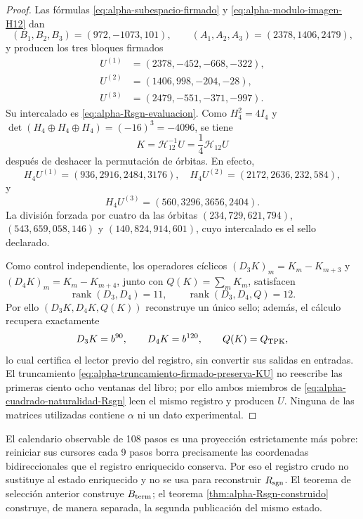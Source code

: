 \begin{proof}
Las fórmulas \eqref{eq:alpha-subespacio-firmado} y
\eqref{eq:alpha-modulo-imagen-H12} dan
\[
 (B_1,B_2,B_3)=(972,-1073,101),\qquad
 (A_1,A_2,A_3)=(2378,1406,2479),
\]
y producen los tres bloques firmados
\[
\begin{aligned}
 U^{(1)}&=(2378,-452,-668,-322),\\
 U^{(2)}&=(1406,998,-204,-28),\\
 U^{(3)}&=(2479,-551,-371,-997).
\end{aligned}
\]
Su intercalado es \eqref{eq:alpha-Rsgn-evaluacion}. Como
\(H_4^2=4I_4\) y
\(\det(H_4\oplus H_4\oplus H_4)=(-16)^3=-4096\), se tiene
\begin{equation}\label{eq:alpha-Rsgn-inversa}
 K=\mathcal H_{12}^{-1}U
 =\frac14\mathcal H_{12}U
\end{equation}
después de deshacer la permutación de órbitas. En efecto,
\[
 H_4U^{(1)}=(936,2916,2484,3176),\quad
 H_4U^{(2)}=(2172,2636,232,584),
\]
y
\[
 H_4U^{(3)}=(560,3296,3656,2404).
\]
La división forzada por cuatro da las órbitas
\((234,729,621,794)\), \((543,659,058,146)\) y
\((140,824,914,601)\), cuyo intercalado es el sello declarado.

Como control independiente, los operadores cíclicos
\((D_3K)_m=K_m-K_{m+3}\) y
\((D_4K)_m=K_m-K_{m+4}\), junto con \(Q(K)=\sum_mK_m\), satisfacen
\begin{equation}\label{eq:alpha-extractor-90-120}
 \operatorname{rank}(D_3,D_4)=11,
 \qquad
 \operatorname{rank}(D_3,D_4,Q)=12.
\end{equation}
Por ello \((D_3K,D_4K,Q(K))\) reconstruye un único sello; además, el
cálculo recupera exactamente
\[
 D_3K=b^{90},\qquad D_4K=b^{120},\qquad Q(K)=Q_{\rm TPK},
\]
lo cual certifica el lector previo del registro, sin convertir sus salidas
en entradas. El truncamiento
\eqref{eq:alpha-truncamiento-firmado-preserva-KU} no reescribe las primeras
ciento ocho ventanas del libro; por ello ambos miembros de
\eqref{eq:alpha-cuadrado-naturalidad-Rsgn} leen el mismo registro y
producen \(U\). Ninguna de las matrices utilizadas contiene \(\alpha\) ni
un dato experimental.
\end{proof}

El calendario observable de 108 pasos es una proyección estrictamente más
pobre: reiniciar sus cursores cada 9 pasos borra precisamente las
coordenadas bidireccionales que el registro enriquecido conserva. Por
eso el registro crudo no sustituye al estado enriquecido y no se usa para
reconstruir \(R_{\rm sgn}\). El teorema de selección anterior construye
\(B_{\rm term}\); el teorema \ref{thm:alpha-Rsgn-construido} construye, de
manera separada, la segunda publicación del mismo estado.

